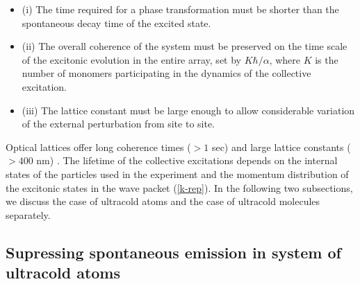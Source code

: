 \begin{itemize}
\item
 (i) The time required for a  phase transformation must
be shorter than the spontaneous decay time of the excited
state.

\item
 (ii) The overall coherence of the system  must be preserved
on the time scale of the excitonic evolution in the entire array, set by $K\hbar/\alpha$, where $K$
 is the number of monomers participating in the dynamics of the collective excitation.

\item
(iii) The lattice constant must be large enough to allow considerable variation of the external
 perturbation from site to site.

%
\end{itemize}

Optical lattices offer long coherence times ($> 1$ sec) and large lattice constants ($>400$ nm)
 \cite{optical-lattice-review}. The lifetime of the
collective excitations depends on the internal states
 of the particles used in the experiment and the momentum distribution of the excitonic states in the wave packet
(\ref{k-rep}). In the following two subsections, we discuss the case of ultracold atoms and the case of ultracold molecules separately. 

\subsection{Supressing spontaneous emission in system of ultracold atoms}
\label{sec:excitationAtoms}


